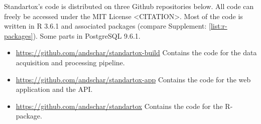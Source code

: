 Standartox's code is distributed on three Github repositories below. All code can freely be accessed under the MIT License <CITATION>. Most of the code is written in R 3.6.1 and associated packages (compare Supplement: \ref{list:r-packages}). Some parts in PostgreSQL 9.6.1.

\begin{itemize}

\item \url{https://github.com/andschar/standartox-build} \newline
Contains the code for the data acquisition and processing pipeline.

\item \url{https://github.com/andschar/standartox-app} \newline
Contains the code for the web application and the API.

\item \url{https://github.com/andschar/standartox} \newline
Contains the code for the R-package.

\end{itemize}

\iffalse
\textbf{OLD: Standartox aggregates the test results according to chosen filters in a two step process. Firstly the filtered test results are aggregated by the CAS number, the chosen taxon and the selected test duration. Secondly, the returned data is then aggregated by the CAS number. The former can't be influenced by the user and calculates either the minimum or the median depending on the amount of results to aggregate (n <= 2: minimum, if n > 2: median). Thereof the second step calculates the minimum, the maximum, the median, the geometric mean, or the arithmetic mean as an aggregate.}
\fi


